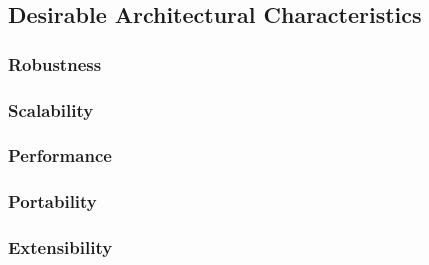 \documentclass[12pt]{article}
\begin{document}
        \subsection{Desirable Architectural Characteristics}
            \subsubsection{Robustness}
            \subsubsection{Scalability}
            \subsubsection{Performance}
            \subsubsection{Portability}
            \subsubsection{Extensibility}
\end{document}
